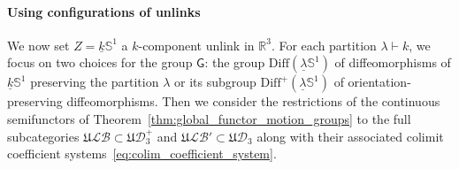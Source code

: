 \documentclass[AHL,Unicode,published]{cedram}
\newcommand{\Diff}{\mathrm{Diff}}
\newcommand{\fU}{\ensuremath{\mathfrak{U}}}
\newcommand{\sG}{\mathsf{G}}
\newcommand{\cB}{\mathcal{B}}
\newcommand{\cD}{\mathcal{D}}
\newcommand{\cL}{\mathcal{L}}
\newcommand{\bR}{\mathbb{R}}
\newcommand{\bS}{\mathbb{S}}
\begin{document}
\paragraph*{Using configurations of unlinks}
We now set $Z=\underline{k}\bS^{1}$ a $k$-component unlink in $\bR^{3}$. For each partition $\lambda \vdash k$, we focus on two choices for the group $\sG$: the group $\Diff(\underline{\lambda}\bS^{1})$ of diffeomorphisms of $\underline{k}\bS^{1}$ preserving the partition $\lambda$ or its subgroup $\Diff^{+}(\underline{\lambda}\bS^{1})$ of orientation-preserving diffeomorphisms. Then we consider the restrictions of the continuous semifunctors of Theorem~\ref{thm:global_functor_motion_groups} to the full subcategories $\fU\cL\cB\subset \fU\cD^{+}_{3}$ and $\fU\cL\cB'\subset \fU\cD_{3}$ along with their associated colimit coefficient systems~\eqref{eq:colim_coefficient_system}.
\end{document}
